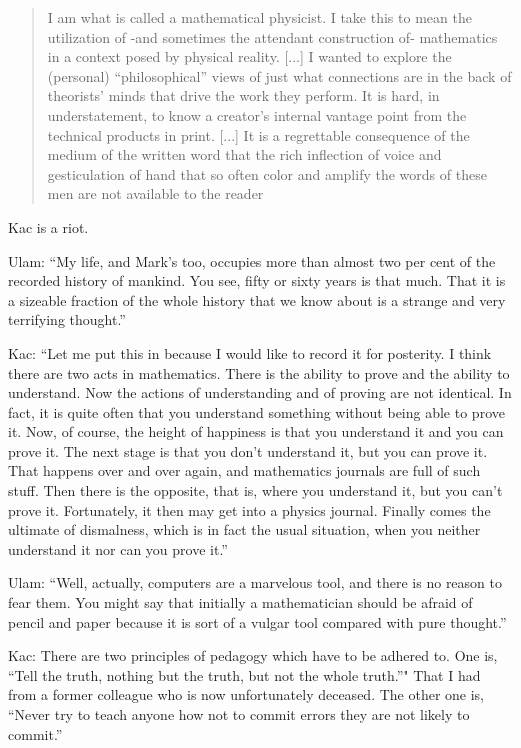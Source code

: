 \begin{description}
\begin{quote}
I am what is called a mathematical physicist. I take this to mean the
utilization of -and sometimes the attendant construction of- mathematics
in a context posed by physical reality.
[...]
I wanted to explore the (personal) ``philosophical'' views of just what
connections are in the back of theorists' minds that drive the work they
perform. It is hard, in understatement, to know a creator's internal
vantage point from the technical products in print.
[...]
It is a regrettable consequence of the medium of the
written word that the rich inflection of voice and gesticulation of
hand that so often color and amplify the words of these men are not
available to the reader
\end{quote}

Kac is a riot.

Ulam: ``My life, and Mark's too, occupies more than almost two per cent
of the recorded history of mankind. You see, fifty or sixty years is that
much. That it is a sizeable fraction of the whole history that we know
about is a strange and very terrifying thought.''

Kac: ``Let me put this in because I would like to
record it for posterity. I think there are two acts in mathematics.
There is the ability to prove and the ability to understand. Now the
actions of understanding and of proving are not identical. In fact, it is
quite often that you understand something without being able to
prove it. Now, of course, the height of happiness is that you
understand it and you can prove it. The next stage is that you don't
understand it, but you can prove it. That happens over and over
again, and mathematics journals are full of such stuff. Then there is
the opposite, that is, where you understand it, but you can't prove it.
Fortunately, it then may get into a physics journal. Finally comes the
ultimate of dismalness, which is in fact the usual situation, when you
neither understand it nor can you prove it.''

Ulam: ``Well, actually, computers are a marvelous tool, and there is
no reason to fear them. You might say that initially a mathematician
should be afraid of pencil and paper because it is sort of a vulgar tool
compared with pure thought.''

Kac: There are two principles of pedagogy which have to be adhered to.
One is, ``Tell the truth, nothing but the truth, but not the whole
truth.''" That I had from a former colleague who is now unfortunately
deceased. The other one is, ``Never try to teach anyone how not to commit
errors they are not likely to commit.''


\end{description}
